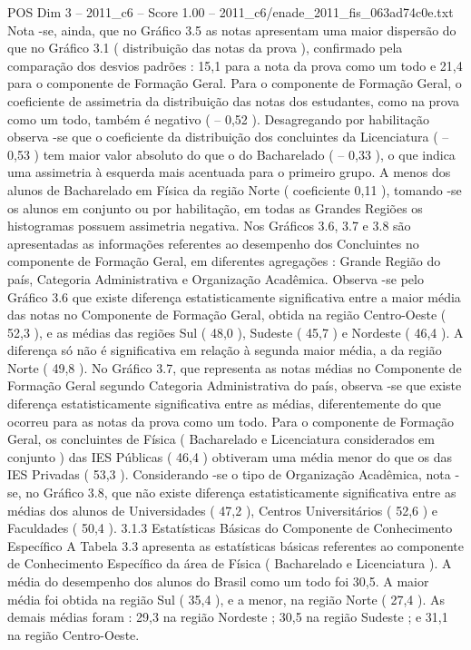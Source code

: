 \begin{textsample}{POS Dim 3 – 2011\_c6 – Score 1.00 – 2011\_c6/enade\_2011\_fis\_063ad74c0e.txt}
Nota -se, ainda, que no Gráfico 3.5 as notas apresentam uma maior dispersão do que no Gráfico 3.1 ( distribuição das notas da prova ), confirmado pela comparação dos desvios padrões : 15,1 para a nota da prova como um todo e 21,4 para o componente de Formação Geral.
Para o componente de Formação Geral, o coeficiente de assimetria da distribuição das notas dos estudantes, como na prova como um todo, também é negativo ( – 0,52 ).
Desagregando por habilitação observa -se que o coeficiente da distribuição dos concluintes da Licenciatura ( – 0,53 ) tem maior valor absoluto do que o do Bacharelado ( – 0,33 ), o que indica uma assimetria à esquerda mais acentuada para o primeiro grupo.
A menos dos alunos de Bacharelado em Física da região Norte ( coeficiente 0,11 ), tomando -se os alunos em conjunto ou por habilitação, em todas as Grandes Regiões os histogramas possuem assimetria negativa.
Nos Gráficos 3.6, 3.7 e 3.8 são apresentadas as informações referentes ao desempenho dos Concluintes no componente de Formação Geral, em diferentes agregações : Grande Região do país, Categoria Administrativa e Organização Acadêmica.
Observa -se pelo Gráfico 3.6 que existe diferença estatisticamente significativa entre a maior média das notas no Componente de Formação Geral, obtida na região Centro-Oeste ( 52,3 ), e as médias das regiões Sul ( 48,0 ), Sudeste ( 45,7 ) e Nordeste ( 46,4 ).
A diferença só não é significativa em relação à segunda maior média, a da região Norte ( 49,8 ).
No Gráfico 3.7, que representa as notas médias no Componente de Formação Geral segundo Categoria Administrativa do país, observa -se que existe diferença estatisticamente significativa entre as médias, diferentemente do que ocorreu para as notas da prova como um todo.
Para o componente de Formação Geral, os concluintes de Física ( Bacharelado e Licenciatura considerados em conjunto ) das IES Públicas ( 46,4 ) obtiveram uma média menor do que os das IES Privadas ( 53,3 ).
Considerando -se o tipo de Organização Acadêmica, nota -se, no Gráfico 3.8, que não existe diferença estatisticamente significativa entre as médias dos alunos de Universidades ( 47,2 ), Centros Universitários ( 52,6 ) e Faculdades ( 50,4 ). 3.1.3 Estatísticas Básicas do Componente de Conhecimento Específico A Tabela 3.3 apresenta as estatísticas básicas referentes ao componente de Conhecimento Específico da área de Física ( Bacharelado e Licenciatura ).
A média do desempenho dos alunos do Brasil como um todo foi 30,5.
A maior média foi obtida na região Sul ( 35,4 ), e a menor, na região Norte ( 27,4 ).
As demais médias foram : 29,3 na região Nordeste ; 30,5 na região Sudeste ; e 31,1 na região Centro-Oeste.

\end{textsample}

